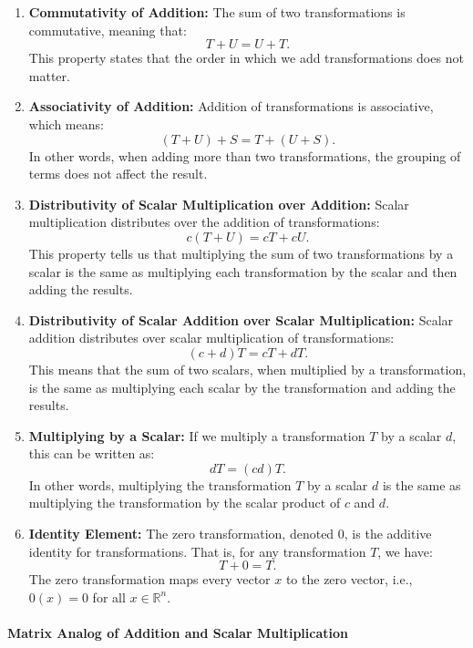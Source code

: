 \documentclass[a4paper,12pt]{article}
\begin{document}
\begin{enumerate}
    \item \textbf{Commutativity of Addition:} The sum of two transformations is commutative, meaning that:
    \[
    T + U = U + T.
    \]
    This property states that the order in which we add transformations does not matter.

    \item \textbf{Associativity of Addition:} Addition of transformations is associative, which means:
    \[
    (T + U) + S = T + (U + S).
    \]
    In other words, when adding more than two transformations, the grouping of terms does not affect the result.

    \item \textbf{Distributivity of Scalar Multiplication over Addition:} Scalar multiplication distributes over the addition of transformations:
    \[
    c(T + U) = cT + cU.
    \]
    This property tells us that multiplying the sum of two transformations by a scalar is the same as multiplying each transformation by the scalar and then adding the results.

    \item \textbf{Distributivity of Scalar Addition over Scalar Multiplication:} Scalar addition distributes over scalar multiplication of transformations:
    \[
    (c + d)T = cT + dT.
    \]
    This means that the sum of two scalars, when multiplied by a transformation, is the same as multiplying each scalar by the transformation and adding the results.

    \item \textbf{Multiplying by a Scalar:} If we multiply a transformation \( T \) by a scalar \( d \), this can be written as:
    \[
    dT = (cd)T.
    \]
    In other words, multiplying the transformation \( T \) by a scalar \( d \) is the same as multiplying the transformation by the scalar product of \( c \) and \( d \).

    \item \textbf{Identity Element:} The zero transformation, denoted \( 0 \), is the additive identity for transformations. That is, for any transformation \( T \), we have:
    \[
    T + 0 = T.
    \]
    The zero transformation maps every vector \( x \) to the zero vector, i.e., \( 0(x) = 0 \) for all \( x \in \mathbb{R}^n \).

\end{enumerate}

\paragraph{Matrix Analog of Addition and Scalar Multiplication}
\end{document}
